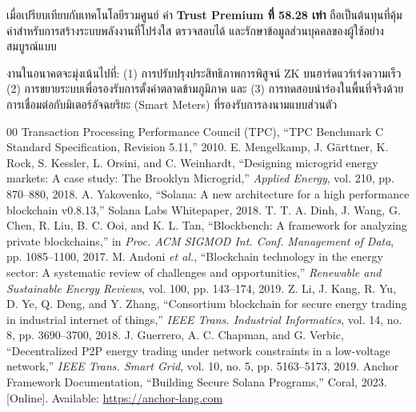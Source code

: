 \documentclass[conference,10pt]{IEEEtran}
\begin{document}
เมื่อเปรียบเทียบกับเทคโนโลยีรวมศูนย์ ค่า \textbf{Trust Premium ที่ 58.28 เท่า} ถือเป็นต้นทุนที่คุ้มค่าสำหรับการสร้างระบบพลังงานที่โปร่งใส ตรวจสอบได้ และรักษาข้อมูลส่วนบุคคลของผู้ใช้อย่างสมบูรณ์แบบ

งานในอนาคตจะมุ่งเน้นไปที่: (1) การปรับปรุงประสิทธิภาพการพิสูจน์ ZK บนฮาร์ดแวร์เร่งความเร็ว (2) การขยายระบบเพื่อรองรับการตั้งค่าตลาดข้ามภูมิภาค และ (3) การทดสอบนำร่องในพื้นที่จริงด้วยการเชื่อมต่อกับมิเตอร์อัจฉยริยะ (Smart Meters) ที่รองรับการลงนามแบบส่วนตัว


\begin{thebibliography}{00}
 Transaction Processing Performance Council (TPC), ``TPC Benchmark C Standard Specification, Revision 5.11,'' 2010.
 E. Mengelkamp, J. G{\"a}rttner, K. Rock, S. Kessler, L. Orsini, and C. Weinhardt, ``Designing microgrid energy markets: A case study: The Brooklyn Microgrid,'' \textit{Applied Energy}, vol. 210, pp. 870--880, 2018.
 A. Yakovenko, ``Solana: A new architecture for a high performance blockchain v0.8.13,'' Solana Labs Whitepaper, 2018.
 T. T. A. Dinh, J. Wang, G. Chen, R. Liu, B. C. Ooi, and K. L. Tan, ``Blockbench: A framework for analyzing private blockchains,'' in \textit{Proc. ACM SIGMOD Int. Conf. Management of Data}, pp. 1085--1100, 2017.
 M. Andoni \textit{et al.}, ``Blockchain technology in the energy sector: A systematic review of challenges and opportunities,'' \textit{Renewable and Sustainable Energy Reviews}, vol. 100, pp. 143--174, 2019.
 Z. Li, J. Kang, R. Yu, D. Ye, Q. Deng, and Y. Zhang, ``Consortium blockchain for secure energy trading in industrial internet of things,'' \textit{IEEE Trans. Industrial Informatics}, vol. 14, no. 8, pp. 3690--3700, 2018.
 J. Guerrero, A. C. Chapman, and G. Verbic, ``Decentralized P2P energy trading under network constraints in a low-voltage network,'' \textit{IEEE Trans. Smart Grid}, vol. 10, no. 5, pp. 5163--5173, 2019.
 Anchor Framework Documentation, ``Building Secure Solana Programs,'' Coral, 2023. [Online]. Available: \url{https://anchor-lang.com}
\end{thebibliography}
\end{document}
